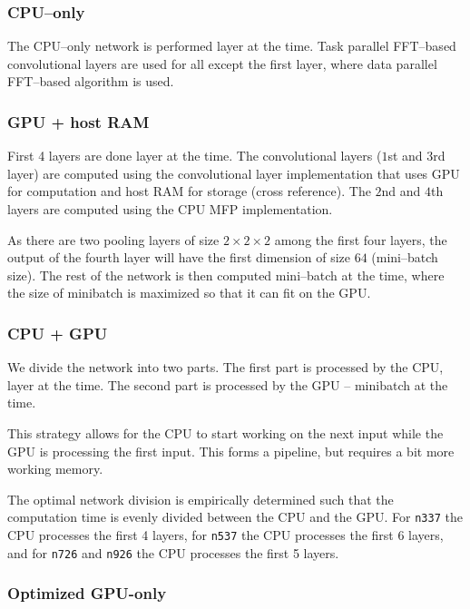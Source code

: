 \documentclass[conference]{IEEEtran}
\begin{document}
  \subsubsection{CPU--only}

  The CPU--only network is performed layer at the time.  Task parallel
  FFT--based convolutional layers are used for all except the first
  layer, where data parallel FFT--based algorithm is used.

  \subsubsection{GPU + host RAM}

  First 4 layers are done layer at the time.  The convolutional layers
  ($1$st and $3$rd layer) are computed using the convolutional layer
  implementation that uses GPU for computation and host RAM for
  storage (cross reference).  The $2$nd and $4$th layers are computed
  using the CPU MFP implementation.

  As there are two pooling layers of size $2 \times 2 \times 2$ among
  the first four layers, the output of the fourth layer will have the
  first dimension of size $64$ (mini--batch size).  The rest of the
  network is then computed mini--batch at the time, where the size of
  minibatch is maximized so that it can fit on the GPU.

  \subsubsection{CPU + GPU}

  We divide the network into two parts.  The first part is processed
  by the CPU, layer at the time.  The second part is processed by the
  GPU -- minibatch at the time.

  This strategy allows for the CPU to start working on the next input
  while the GPU is processing the first input.  This forms a pipeline,
  but requires a bit more working memory.

  The optimal network division is empirically determined such that the
  computation time is evenly divided between the CPU and the GPU.  For
  {\tt n337} the CPU processes the first 4 layers, for {\tt n537} the
  CPU processes the first 6 layers, and for {\tt n726} and {\tt n926}
  the CPU processes the first 5 layers.

  \subsubsection{Optimized GPU-only}
\end{document}
